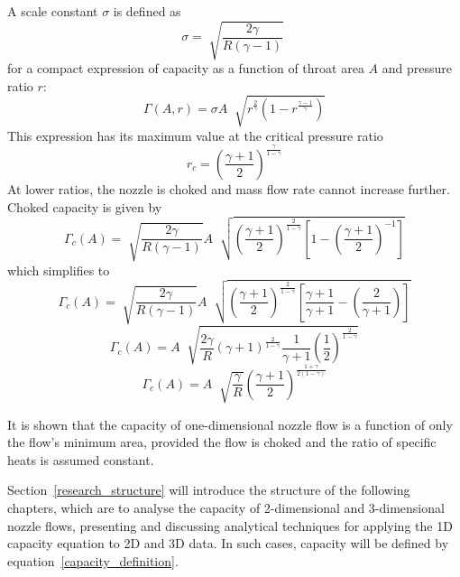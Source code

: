 \documentclass[a4paper, 11pt, oneside]{report}
\begin{document}
A scale constant $\sigma$ is defined as
\begin{equation}
\sigma = 
\sqrt[]{\frac{2\gamma}{R\left(\gamma-1\right)}} \;
\end{equation}
for a compact expression of capacity as a function of throat area $A$ and pressure ratio $r$:
\begin{equation}
\Gamma \left( A, r \right) = 
\sigma
A \;
\sqrt[]{
	r^\frac{2}{\gamma}
	\left(
		1 - r ^\frac{\gamma-1}{\gamma}
	\right) 
}
\end{equation}
This expression has its maximum value at the critical pressure ratio
\begin{equation}
r_c =
\left(
	\frac{\gamma+1}{2}
\right)
^\frac{\gamma}{1-\gamma}
\end{equation}
At lower ratios, the nozzle is choked and mass flow rate cannot increase further. Choked capacity is given by
\begin{equation}
\Gamma_c \left( A \right) =
\sqrt[]{\frac{2\gamma}{R\left(\gamma-1\right)}}
A \;
\sqrt[]{
	\left(
		\frac{\gamma+1}{2}  
	\right)
	^\frac{2}{1-\gamma}
	\left[
		1 - 
		\left(
			\frac{\gamma+1}{2}
		\right)
		^{-1}
	\right]
}
\end{equation}
which simplifies to
\begin{equation}
\Gamma_c \left( A \right) =
\sqrt[]{\frac{2\gamma}{R\left(\gamma-1\right)}}
A \;
\sqrt[]{
	\left(
		\frac{\gamma+1}{2}  
	\right)
	^\frac{2}{1-\gamma}
	\left[
		\frac{\gamma+1}{\gamma+1}
		-
		\left(
			\frac{2}{\gamma+1}
		\right)
	\right]
}
\end{equation}
\begin{equation}
\Gamma_c \left( A \right) =
A \;
\sqrt[]{
	\frac{2\gamma}{R}
	\left(
		\gamma+1
	\right)
	^\frac{2}{1-\gamma}
	\frac{1}{\gamma+1}
	\left(
		\frac{1}{2}
	\right)
	^\frac{2}{1-\gamma}
}
\end{equation}
\begin{equation}\label{choked_capacity_from_area}
\Gamma_c \left( A \right) =
A \;
\sqrt[]{
	\frac{\gamma}{R}
}
\left(
	\frac{\gamma+1}{2}
\right)
^\frac{1+\gamma}{2\left(1-\gamma\right)}
\end{equation}

It is shown that the capacity of one-dimensional nozzle flow is a function of only the flow's minimum area, provided the flow is choked and the ratio of specific heats is assumed constant. 

Section~\ref{research_structure} will introduce the structure of the following chapters, which are to analyse the capacity of 2-dimensional and 3-dimensional nozzle flows, presenting and discussing analytical techniques for applying the 1D capacity equation to 2D and 3D data. In such cases, capacity will be defined by equation~\ref{capacity_definition}.
\end{document}
